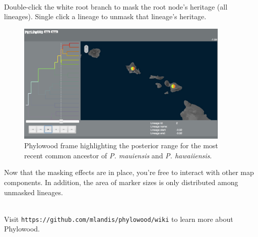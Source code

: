 \noindent \\ \impmark Double-click the white root branch to mask the root node's heritage (all lineages). Single click a lineage to unmask that lineage's heritage. \\

\begin{figure}[H]
\centering
\includegraphics[width=4in]{figures/phw_br23}
\caption{Phylowood frame highlighting the posterior range for the most recent common ancestor of {\it P. mauiensis} and {\it P. hawaiiensis}.}
\end{figure}

Now that the masking effects are in place, you're free to interact with other map components.
In addition, the area of marker sizes is only distributed among unmasked lineages.

\noindent \\ \impmark Visit \texttt{https://github.com/mlandis/phylowood/wiki} to learn more about Phylowood.






